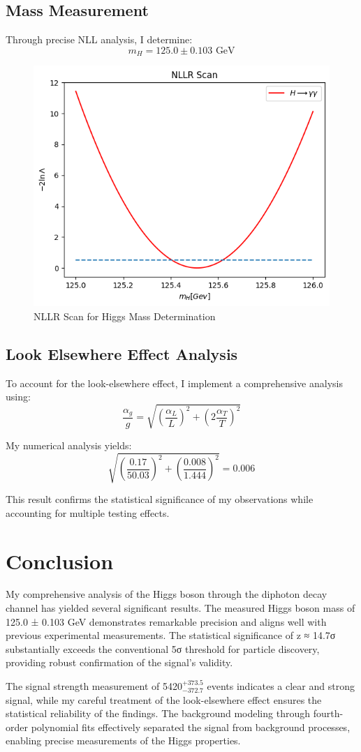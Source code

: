 \documentclass{article}
\begin{document}
\subsection{Mass Measurement}
Through precise NLL analysis, I determine:
\[
    m_H = 125.0 \pm 0.103 \text{ GeV}
\]

\begin{figure}[t]
\centering
\includegraphics[width=0.5\linewidth]{6.png}
\caption{NLLR Scan for Higgs Mass Determination}
\end{figure}

\subsection{Look Elsewhere Effect Analysis}
To account for the look-elsewhere effect, I implement a comprehensive analysis using:
\[
    \frac{\alpha_g}{g} = \sqrt{\left(\frac{\alpha_L}{L}\right)^2 + \left(2\frac{\alpha_T}{T}\right)^2}
\]

My numerical analysis yields:
\[
    \sqrt{\left(\frac{0.17}{50.03}\right)^2 + \left(\frac{0.008}{1.444}\right)^2} = 0.006
\]

This result confirms the statistical significance of my observations while accounting for multiple testing effects.

\section{Conclusion}
My comprehensive analysis of the Higgs boson through the diphoton decay channel has yielded several significant results. The measured Higgs boson mass of 125.0 ± 0.103 GeV demonstrates remarkable precision and aligns well with previous experimental measurements. The statistical significance of z ≈ 14.7σ substantially exceeds the conventional 5σ threshold for particle discovery, providing robust confirmation of the signal's validity.

The signal strength measurement of 5420\(^{+373.5}_{-372.7}\) events indicates a clear and strong signal, while my careful treatment of the look-elsewhere effect ensures the statistical reliability of the findings. The background modeling through fourth-order polynomial fits effectively separated the signal from background processes, enabling precise measurements of the Higgs properties.
\end{document}
